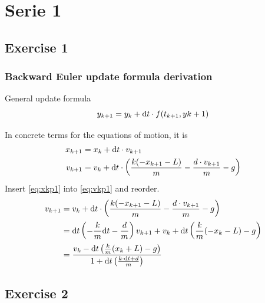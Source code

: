 \chapter*{Serie 1}
\section*{Exercise 1}
\subsection*{Backward Euler update formula derivation}
General update formula
\begin{equation}
 y_{k+1} = y_k + \mathrm d t \cdot f(t_{k+1}, y{k+1})
\end{equation}

In concrete terms for the equations of motion, it is
\begin{subequations}
 \begin{align}
  x_{k+1} &= x_k + \mathrm d t \cdot v_{k+1}
  \label{eq:xkp1}\\
  v_{k+1} &= v_k + \mathrm d t \cdot \left( \frac{k(-x_{k+1} -L)}{m} - \frac{d\cdot v_{k+1}}{m} -g \right)
  \label{eq:vkp1}
 \end{align}
\end{subequations}
Insert \eqref{eq:xkp1} into \eqref{eq:vkp1} and reorder.
\begin{subequations}
 \begin{align}
  v_{k+1} &= v_k + \mathrm d t \cdot \left( \frac{k(-x_{k+1} -L)}{m} - \frac{d\cdot v_{k+1}}{m} -g \right)\\
          &= \mathrm d t\left(-\frac{k}{m}\mathrm d t - \frac{d}{m}\right) v_{k+1} + v_k + \mathrm d t\left( \frac{k}{m}(-x_k-L)-g \right)\\
          &= \frac{ v_k -\mathrm d t \left(\frac{k}{m} (x_k + L) -g \right)}{1+\mathrm d t \left( \frac{k\cdot \mathrm d t + d}{m} \right)}
 \end{align}
\end{subequations}
\section*{Exercise 2}
